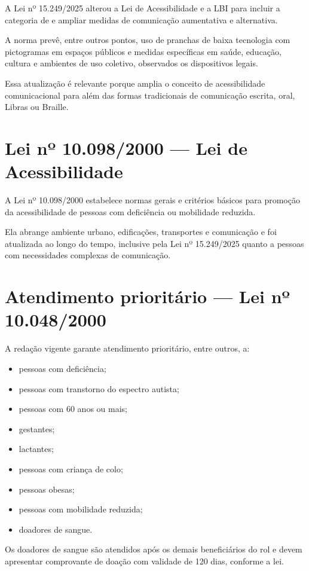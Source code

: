 A Lei nº 15.249/2025 alterou a Lei de Acessibilidade e a LBI para incluir a categoria de  e ampliar medidas de comunicação aumentativa e alternativa.

A norma prevê, entre outros pontos, uso de pranchas de baixa tecnologia com pictogramas em espaços públicos e medidas específicas em saúde, educação, cultura e ambientes de uso coletivo, observados os dispositivos legais.

Essa atualização é relevante porque amplia o conceito de acessibilidade comunicacional para além das formas tradicionais de comunicação escrita, oral, Libras ou Braille.

\section{Lei nº 10.098/2000 — Lei de Acessibilidade}

A Lei nº 10.098/2000 estabelece normas gerais e critérios básicos para promoção da acessibilidade de pessoas com deficiência ou mobilidade reduzida.

Ela abrange ambiente urbano, edificações, transportes e comunicação e foi atualizada ao longo do tempo, inclusive pela Lei nº 15.249/2025 quanto a pessoas com necessidades complexas de comunicação.

\section{Atendimento prioritário — Lei nº 10.048/2000}

A redação vigente garante atendimento prioritário, entre outros, a:
\begin{itemize}
\item pessoas com deficiência;
\item pessoas com transtorno do espectro autista;
\item pessoas com 60 anos ou mais;
\item gestantes;
\item lactantes;
\item pessoas com criança de colo;
\item pessoas obesas;
\item pessoas com mobilidade reduzida;
\item doadores de sangue.
\end{itemize}

Os doadores de sangue são atendidos após os demais beneficiários do rol e devem apresentar comprovante de doação com validade de 120 dias, conforme a lei.


